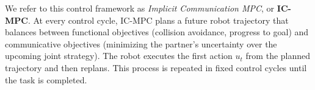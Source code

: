We refer to this control framework as \emph{Implicit Communication MPC}, or \textbf{IC-MPC}. At every control cycle, IC-MPC plans a future robot trajectory that balances between functional objectives (collision avoidance, progress to goal) and communicative objectives (minimizing the partner's uncertainty over the upcoming joint strategy). The robot executes the first action $u_t$ from the planned trajectory and then replans. This process is repeated in fixed control cycles until the task is completed.
